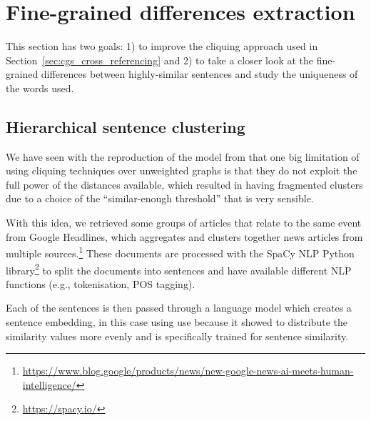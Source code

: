 \section{\statusgreen Fine-grained differences extraction}
\label{sec:cgs_clustering_and_differences}

This section has two goals: 1) to improve the cliquing approach used in Section~\ref{sec:cgs_cross_referencing} and 2) to take a closer look at the fine-grained differences between highly-similar sentences and study the uniqueness of the words used.


\subsection{\statusorange Hierarchical sentence clustering}
\label{sec:cgs_clustering_and_differences_hierarchical}


We have seen with the reproduction of the model from \citet{bountouridis2018explaining} that one big limitation of using cliquing techniques over unweighted graphs is that they do not exploit the full power of the distances available, which resulted in having fragmented clusters due to a choice of the ``similar-enough threshold'' that is very sensible.

With this idea, we retrieved some groups of articles that relate to the same event from Google Headlines, which aggregates and clusters together news articles from multiple sources.\footnote{\url{https://www.blog.google/products/news/new-google-news-ai-meets-human-intelligence/}}
These documents are processed with the SpaCy NLP Python library\footnote{\url{https://spacy.io/}} to split the documents into sentences and have available different NLP functions (e.g., tokenisation, POS tagging).

Each of the sentences is then passed through a language model which creates a sentence embedding, in this case using \acrshort{use} because it showed to distribute the similarity values more evenly and is specifically trained for sentence similarity.

